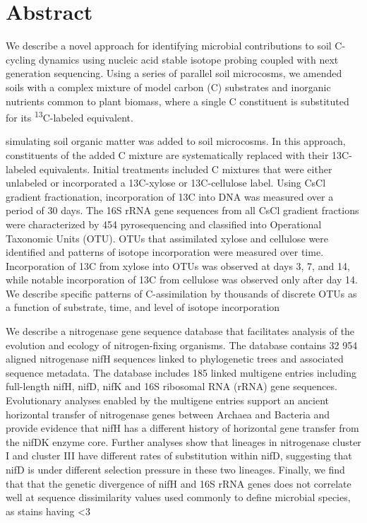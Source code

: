 \section{Abstract} 
We describe a novel approach for identifying microbial contributions to soil C-cycling dynamics using nucleic acid stable isotope probing coupled with next generation sequencing. Using a series of parallel soil microcosms, we amended soils with a complex mixture of model carbon (C) substrates and inorganic nutrients common to plant biomass, where a single C constituent is substituted for its \textsuperscript{13}C-labeled equivalent.

simulating soil organic matter was added to soil microcosms. In this approach, constituents of the added C mixture are systematically replaced with their 13C-labeled equivalents. Initial treatments included C mixtures that were either unlabeled or incorporated a 13C-xylose or 13C-cellulose label.  Using CsCl gradient fractionation, incorporation of 13C into DNA was measured over a period of 30 days. The 16S rRNA gene sequences from all CsCl gradient fractions were characterized by 454 pyrosequencing and classified into Operational Taxonomic Units (OTU).  OTUs that assimilated xylose and cellulose were identified and patterns of isotope incorporation were measured over time. Incorporation of 13C from xylose into OTUs was observed at days 3, 7, and 14, while notable incorporation of 13C from cellulose was observed only after day 14. We describe specific patterns of C-assimilation by thousands of discrete OTUs as a function of substrate, time, and level of isotope incorporation

We describe a nitrogenase gene sequence database that facilitates analysis of the evolution and ecology of nitrogen-fixing organisms. The database contains 32 954 aligned nitrogenase nifH sequences linked to phylogenetic trees and associated sequence metadata. The database includes 185 linked multigene entries including full-length nifH, nifD, nifK and 16S ribosomal RNA (rRNA) gene sequences. Evolutionary analyses enabled by the multigene entries support an ancient horizontal transfer of nitrogenase genes between Archaea and Bacteria and provide evidence that nifH has a different history of horizontal gene transfer from the nifDK enzyme core. Further analyses show that lineages in nitrogenase cluster I and cluster III have different rates of substitution within nifD, suggesting that nifD is under different selection pressure in these two lineages. Finally, we find that that the genetic divergence of nifH and 16S rRNA genes does not correlate well at sequence dissimilarity values used commonly to define microbial species, as stains having <3%